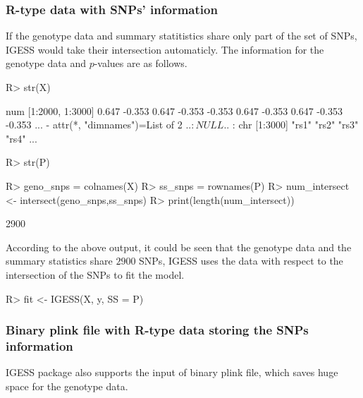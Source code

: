 \documentclass[11pt]{article}
\begin{document}
\subsubsection{R-type data with SNPs' information}
If the genotype data and summary statitistics share only part of the set of SNPs, IGESS would take their intersection automaticly. The information for the genotype data and $p$-values are as follows.
\begin{Schunk}
\begin{Sinput}
R> str(X)
\end{Sinput}
\begin{Soutput}
 num [1:2000, 1:3000] 0.647 -0.353 0.647 -0.353 -0.353 0.647 -0.353 0.647 -0.353 -0.353 ...
 - attr(*, "dimnames")=List of 2
  ..$ : NULL
  ..$ : chr [1:3000] "rs1" "rs2" "rs3" "rs4" ...
\end{Soutput}
\begin{Sinput}
R> str(P)
\end{Sinput}
\begin{Sinput}
R> geno_snps = colnames(X)
R> ss_snps = rownames(P)
R> num_intersect <- intersect(geno_snps,ss_snps)
R> print(length(num_intersect))
\end{Sinput}
\begin{Soutput}
[1] 2900
\end{Soutput}
\end{Schunk}
According to the above output, it could be seen that the genotype data and the summary statistics share $2900$ SNPs, IGESS uses the data with respect to the intersection of the SNPs to fit the model.

\begin{Schunk}
\begin{Sinput}
R> fit <- IGESS(X, y, SS = P)
\end{Sinput}
\end{Schunk}


\subsubsection{Binary plink file with R-type data storing the SNPs information}
IGESS package also supports the input of binary plink file, which saves huge space for the genotype data.
\end{document}
